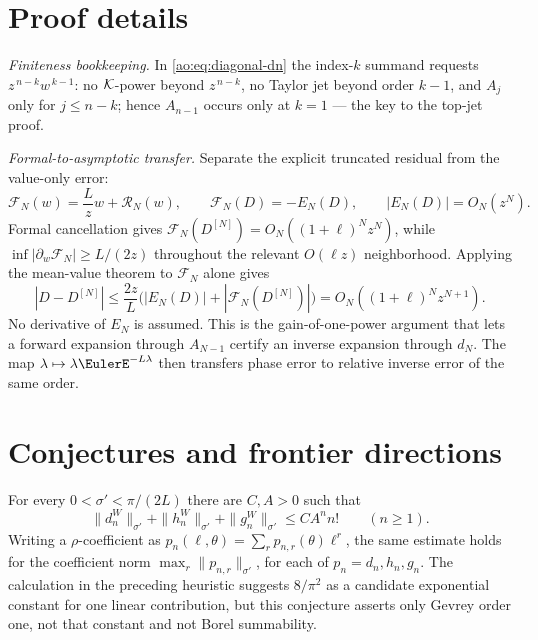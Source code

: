 \section{Proof details}
\label{ao:app:proof-details}

\emph{Finiteness bookkeeping.}  In \eqref{ao:eq:diagonal-dn} the index-$k$
summand requests $z^{\,n-k}w^{\,k-1}$: no $\mathcal K$-power beyond
$z^{\,n-k}$, no Taylor jet beyond order $k-1$, and $A_j$ only for
$j\le n-k$; hence $A_{n-1}$ occurs only at $k=1$ --- the key to the
top-jet proof.

\emph{Formal-to-asymptotic transfer.}  Separate the explicit truncated
residual from the value-only error:
\[
 \mathscr F_N(w)=\frac Lz w+\mathcal R_N(w),
 \qquad \mathscr F_N(D)=-E_N(D),
 \qquad |E_N(D)|=O_N(z^N).
\]
Formal cancellation gives
$\mathscr F_N(D^{[N]})=O_N((1+\ell)^Nz^N)$, while
$\inf|\partial_w\mathscr F_N|\ge L/(2z)$ throughout the relevant
$O(\ell z)$ neighborhood.  Applying the mean-value theorem to
$\mathscr F_N$ alone gives
\[
 |D-D^{[N]}|
 \le\frac{2z}{L}
 \bigl(|E_N(D)|+|\mathscr F_N(D^{[N]})|\bigr)
 =O_N((1+\ell)^Nz^{N+1}).
\]
No derivative of $E_N$ is assumed.  This is the gain-of-one-power argument
that lets a forward expansion through $A_{N-1}$ certify an inverse
expansion through $d_N$.  The map
$\lambda\mapsto\lambda\EulerE^{-L\lambda}$ then transfers phase error to
relative inverse error of the same order.

\section{Conjectures and frontier directions}
\label{ao:sec:conjectures-inv}

\begin{conjecture}
\label{ao:conj:gevrey}
For every $0<\sigma'<\pi/(2L)$ there are $C,A>0$ such that
\[
 \|d_n^W\|_{\sigma'}+\|h_n^W\|_{\sigma'}+
 \|g_n^W\|_{\sigma'}\le CA^nn!\qquad(n\ge1).
\]
Writing a $\rho$-coefficient as
$p_n(\ell,\theta)=\sum_rp_{n,r}(\theta)\ell^r$, the same estimate holds
for the coefficient norm $\max_r\|p_{n,r}\|_{\sigma'}$, for each of
$p_n=d_n,h_n,g_n$.  The calculation in the preceding heuristic suggests
$8/\pi^2$ as a candidate exponential constant for one linear contribution,
but this conjecture asserts only Gevrey order one, not that constant and not
Borel summability.
\end{conjecture}


